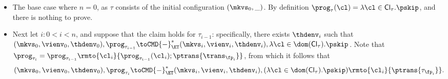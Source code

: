 \begin{itemize}
\item The base case where  $n = 0$, as $\tau$ consists of the initial configuration $(\mkvs_{0}, \_)$. 
By definition $\prog_{\tau}(\cl) = \lambda \cl \in \mathsf{Cl}_{\tau}.\pskip$, and there is nothing to prove.

\item Next let $i: 0 < i < n$, and suppose that the claim holds for $\tau_{i-1}$: specifically, there exists 
$\thdenv_{i}$ such that $(\mkvs_{0}, \vienv_{0}, \thdenv_{0}), \prog_{\tau_{i-1}} \toCMD{-}^{\ast}_{\ET} 
(\mkvs_{i}, \vienv_{i}, \thdenv_{i}), \lambda \cl \in \dom(\mathsf{Cl}_{\tau}).\pskip$. Note that 
$\prog_{\tau_{i}} = \prog_{\tau_{i-1}}\rmto{\cl_{i}}{\prog_{\tau_{i-1}}(\cl_{i}) ; \ptrans{\trans_{\fp_{i}}}}$, 
from which it follows that 
\[
(\mkvs_{0}, \vienv_{0}, \thdenv_{0}), \prog_{\tau_{i}} \toCMD{-}^{\ast}_{\ET} 
(\mkvs_{i}, \vienv_{i}, \thdenv_{i}), (\lambda \cl \in \dom(\mathsf{Cl}_{\tau}).\pskip)\rmto{\cl_{i}}{\ptrans{\tau_{\fp_{i}}}}.
\]

\end{itemize}
%
%
%
%
%
